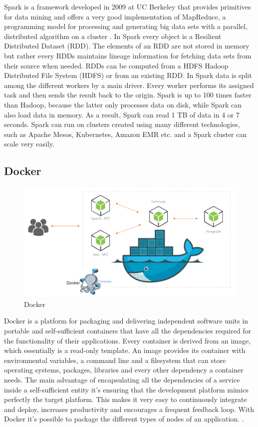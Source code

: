 Spark is a framework developed in 2009 at UC Berkeley \cite{spark} that provides primitives for data mining and offers a very good implementation of MapReduce, a programming model for processing and generating big data sets with a parallel, distributed algorithm on a cluster \cite{mapreduce}. In Spark every object is a Resilient Distributed Dataset (RDD). The elements of an RDD are not stored in memory but rather every RDDs maintains lineage information for fetching data sets from their source when needed. RDDs can be computed from a HDFS Hadoop Distributed File System (HDFS) or from an existing RDD. In Spark data is split among the different workers by a main driver. Every worker performs its assigned task and then sends the result back to the origin. Spark is up to 100 times faster than Hadoop, because the latter only processes data on disk, while Spark can also load data in memory. As a result, Spark can read 1 TB of data in 4 or 7 seconds. Spark can run on clusters created using many different technologies, such as Apache Mesos, Kubernetes, Amazon EMR etc. and a Spark cluster can scale very easily.

\subsection{Docker}

\begin{figure}[H]
	\centering
	\includegraphics[scale=0.4]{img/docker.png}
	\caption{Docker}
\end{figure}

Docker is a platform for packaging and delivering independent software units in portable and self-sufficient containers that have all the dependencies required for the functionality of their applications. Every container is derived from an image, which essentially is a read-only template. An image provides its container with environmental variables, a command line and a filesystem that can store operating systems, packages, libraries and every other dependency a container needs. The main advantage of encapsulating all the dependencies of a service inside a self-sufficient entity it’s ensuring that the development platform mimics perfectly the target platform. This makes it very easy to continuously integrate and deploy, increases productivity and encourages a frequent feedback loop. With Docker it's possible to package the different types of nodes of an application. \cite{docker}.


